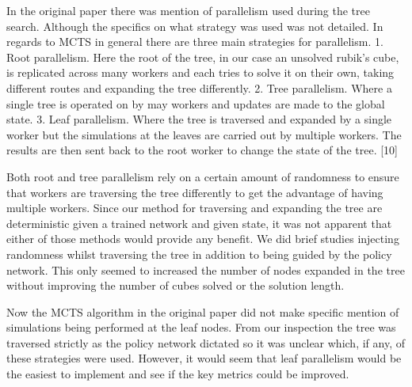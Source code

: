 \documentclass[10pt,twocolumn,letterpaper]{article}
\begin{document}
In the original paper there was mention of parallelism used during the tree search.  Although the specifics on what strategy was used was not detailed.  In regards to MCTS in general there are three main strategies for parallelism. 1. Root parallelism. Here the root of the tree, in our case an unsolved rubik's cube, is replicated across many workers and each tries to solve it on their own, taking different routes and expanding the tree differently.  2. Tree parallelism.  Where a single tree is operated on by may workers and updates are made to the global state. 3. Leaf parallelism.  Where the tree is traversed and expanded by a single worker but the simulations at the leaves are carried out by multiple workers.  The results are then sent back to the root worker to change the state of the tree. [10]

Both root and tree parallelism rely on a certain amount of randomness to ensure that workers are traversing the tree differently to get the advantage of having multiple workers.  Since our method for traversing and expanding the tree are deterministic given a trained network and given state, it was not apparent that either of those methods would provide any benefit.  We did brief studies injecting randomness whilst traversing the tree in addition to being guided by the policy network.  This only seemed to increased the number of nodes expanded in the tree without improving the number of cubes solved or the solution length. 

Now the MCTS algorithm in the original paper did not make specific mention of simulations being performed at the leaf nodes.  From our inspection the tree was traversed strictly as the policy network dictated so it was unclear which, if any, of these strategies were used.  However, it would seem that leaf parallelism would be the easiest to implement and see if the key metrics could be improved. 
\end{document}
